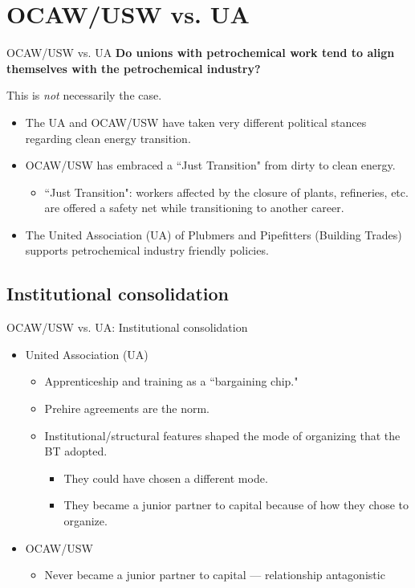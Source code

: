 \documentclass{beamer}
\begin{document}
\section{OCAW/USW vs. UA}
\begin{frame}{OCAW/USW vs. UA}
\textbf{Do unions with petrochemical work tend to align themselves with the petrochemical industry?}\newline

This is \emph{not} necessarily the case.
	\begin{itemize}
		\item The UA and OCAW/USW have taken very different political stances regarding clean energy transition.
		\item OCAW/USW has embraced a ``Just Transition" from dirty to clean energy.
	\begin{itemize}
		\item ``Just Transition": workers affected by the closure of plants, refineries, etc. are offered a safety net while transitioning to another career.
	\end{itemize}
	\item The United Association (UA) of Plubmers and Pipefitters (Building Trades) supports petrochemical industry friendly policies.
	\end{itemize}
\end{frame}

\subsection{Institutional consolidation}
\begin{frame}{OCAW/USW vs. UA: Institutional consolidation}
	\begin{itemize}
		\item United Association (UA)		
			\begin{itemize}
				\item Apprenticeship and training as a ``bargaining chip."
				\item Prehire agreements are the norm.
				\item Institutional/structural features shaped the mode of organizing that the BT adopted.
				\begin{itemize}
					\item They could have chosen a different mode.
					\item They became a junior partner to capital because of how they chose to organize.
				\end{itemize}
	\end{itemize}
		\item OCAW/USW
		\begin{itemize}
			\item Never became a junior partner to capital — relationship antagonistic
		\end{itemize}
	\end{itemize}
\end{frame}
\end{document}
